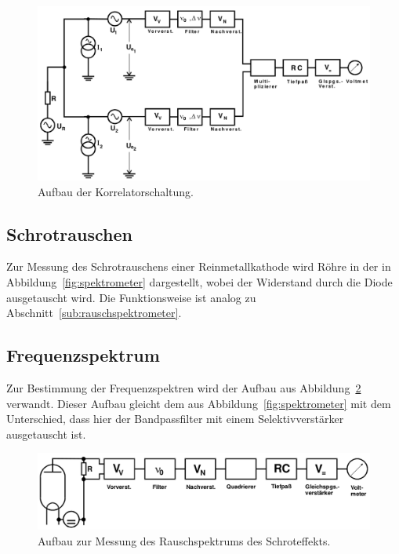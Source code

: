 \begin{figure}[htpb]
  \centering
  \includegraphics[scale=0.3]{bilder/korrelator.png}
  \caption{Aufbau der Korrelatorschaltung.\cite{FP}}
\label{fig:korrelator}
\end{figure}

\subsection{Schrotrauschen}
\label{sub:schrotrauschen}

Zur Messung des Schrotrauschens einer Reinmetallkathode wird Röhre in der in
Abbildung~\ref{fig:spektrometer} dargestellt, wobei der Widerstand durch die
Diode ausgetauscht wird.
Die Funktionsweise ist analog zu Abschnitt~\ref{sub:rauschspektrometer}.

\subsection{Frequenzspektrum}
\label{sub:frequenzspektrum}

Zur Bestimmung der Frequenzspektren wird der Aufbau aus
Abbildung~\ref{fig:schrot} verwandt. Dieser Aufbau gleicht dem aus
Abbildung~\ref{fig:spektrometer} mit dem Unterschied, dass hier der
Bandpassfilter mit einem Selektivverstärker ausgetauscht ist.

\begin{figure}[htpb]
  \centering
  \includegraphics[scale=0.3]{bilder/schrot.png}
  \caption{Aufbau zur Messung des Rauschspektrums des Schroteffekts.\cite{FP}}
\label{fig:schrot}
\end{figure}
